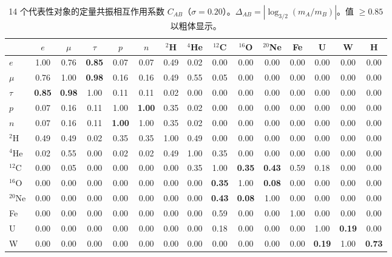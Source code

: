 \documentclass[11pt,a4paper]{article}
\begin{document}
	\begin{table}[H]
		\centering
		\caption{14 个代表性对象的定量共振相互作用系数 \(C_{AB}\)（\(\sigma = 0.20\)）。\(\Delta_{AB} = |\log_{3/2}(m_A/m_B)|\)。值 \(\ge 0.85\) 以粗体显示。}
		\label{tab:CAB}
		\scriptsize
		\begin{tabular}{l c c c c c c c c c c c c c c}
			\toprule
			& \(e\) & \(\mu\) & \(\tau\) & \(p\) & \(n\) & \(^2\)H & \(^4\)He & \(^{12}\)C & \(^{16}\)O & \(^{20}\)Ne & Fe & U & W & H \\
			\midrule
			\(e\) & 1.00 & 0.76 & \textbf{0.85} & 0.07 & 0.07 & 0.49 & 0.02 & 0.00 & 0.00 & 0.00 & 0.00 & 0.00 & 0.00 & 0.00 \\
			\(\mu\) & 0.76 & 1.00 & \textbf{0.98} & 0.16 & 0.16 & 0.49 & 0.55 & 0.05 & 0.00 & 0.00 & 0.00 & 0.00 & 0.00 & 0.00 \\
			\(\tau\) & \textbf{0.85} & \textbf{0.98} & 1.00 & 0.11 & 0.11 & 0.02 & 0.00 & 0.00 & 0.00 & 0.00 & 0.00 & 0.00 & 0.00 & 0.00 \\
			\(p\) & 0.07 & 0.16 & 0.11 & 1.00 & \textbf{1.00} & 0.35 & 0.02 & 0.00 & 0.00 & 0.00 & 0.00 & 0.00 & 0.00 & 0.00 \\
			\(n\) & 0.07 & 0.16 & 0.11 & \textbf{1.00} & 1.00 & 0.35 & 0.02 & 0.00 & 0.00 & 0.00 & 0.00 & 0.00 & 0.00 & 0.00 \\
			\(^2\)H & 0.49 & 0.49 & 0.02 & 0.35 & 0.35 & 1.00 & 0.49 & 0.00 & 0.00 & 0.00 & 0.00 & 0.00 & 0.00 & 0.00 \\
			\(^4\)He & 0.02 & 0.55 & 0.00 & 0.02 & 0.02 & 0.49 & 1.00 & 0.35 & 0.00 & 0.00 & 0.00 & 0.00 & 0.00 & 0.00 \\
			\(^{12}\)C & 0.00 & 0.05 & 0.00 & 0.00 & 0.00 & 0.00 & 0.35 & 1.00 & \textbf{0.35} & \textbf{0.43} & 0.59 & 0.18 & 0.00 & 0.00 \\
			\(^{16}\)O & 0.00 & 0.00 & 0.00 & 0.00 & 0.00 & 0.00 & 0.00 & \textbf{0.35} & 1.00 & \textbf{0.08} & 0.00 & 0.00 & 0.00 & 0.00 \\
			\(^{20}\)Ne & 0.00 & 0.00 & 0.00 & 0.00 & 0.00 & 0.00 & 0.00 & \textbf{0.43} & \textbf{0.08} & 1.00 & 0.00 & 0.00 & 0.00 & 0.00 \\
			Fe & 0.00 & 0.00 & 0.00 & 0.00 & 0.00 & 0.00 & 0.00 & 0.59 & 0.00 & 0.00 & 1.00 & 0.00 & 0.00 & 0.00 \\
			U & 0.00 & 0.00 & 0.00 & 0.00 & 0.00 & 0.00 & 0.00 & 0.18 & 0.00 & 0.00 & 0.00 & 1.00 & \textbf{0.19} & 0.00 \\
			W & 0.00 & 0.00 & 0.00 & 0.00 & 0.00 & 0.00 & 0.00 & 0.00 & 0.00 & 0.00 & 0.00 & \textbf{0.19} & 1.00 & \textbf{0.73} \\

\end{tabular}
\end{table}
\end{document}
